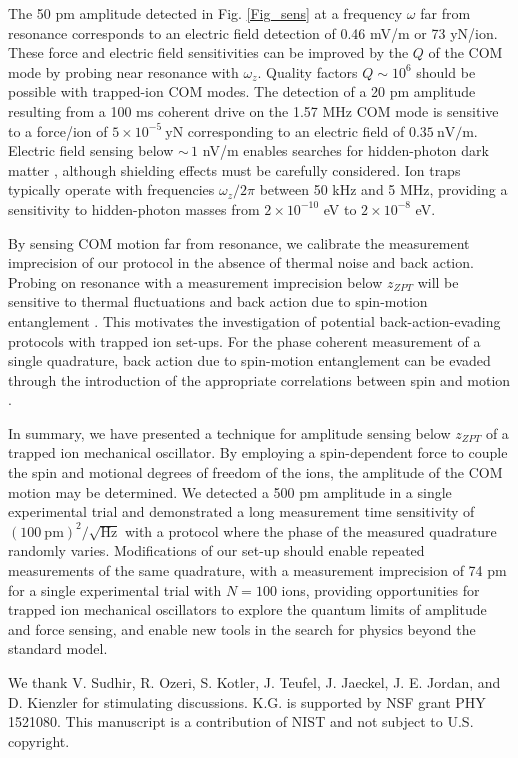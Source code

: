 \documentclass[aps,prl,twocolumn,superscriptaddress,floatfix]{revtex4-1}
\begin{document}
The 50 pm amplitude detected in Fig. \ref{Fig_sens} at a frequency $\omega$ far from resonance corresponds to an electric field detection of 0.46 mV/m or 73 yN/ion. These force and electric field sensitivities can be improved by the $Q$ of the COM mode by probing near resonance with $\omega_z$. Quality factors $Q\sim 10^6$ should be possible with trapped-ion COM modes. The detection of a 20 pm amplitude resulting from a 100 ms coherent drive on the 1.57 MHz COM mode is sensitive to a force/ion of $5\times10^{-5}\:\mathrm{yN}$ corresponding to an electric field of $0.35\:\mathrm{nV/m}$. Electric field sensing below ${\sim} \,1$ nV/m enables searches for hidden-photon dark matter \citep{Arias2012,Chaudhuri2015}, although shielding effects must be carefully considered. Ion traps typically operate with frequencies $\omega_z/2\pi$ between 50 kHz and 5 MHz, providing a sensitivity to hidden-photon masses from $2 \times 10^{-10}$ eV to $2 \times 10^{-8}$ eV. 

By sensing COM motion far from resonance, we calibrate the measurement imprecision of our protocol in the absence of thermal noise and back action. Probing on resonance with a measurement imprecision below $z_{ZPT}$ will be sensitive to thermal fluctuations and back action due to spin-motion entanglement \citep{Sawyer2014}. This motivates the investigation of potential back-action-evading protocols with trapped ion set-ups. For the phase coherent measurement of a single quadrature, back action due to spin-motion entanglement can be evaded through the introduction of the appropriate correlations between spin and motion \citep{Hempel2013}.

In summary, we have presented a technique for amplitude sensing below $z_{ZPT}$ of a trapped ion mechanical oscillator. By employing a spin-dependent force to couple the spin and motional degrees of freedom of the ions, the amplitude of the COM motion may be determined. We detected a 500 pm amplitude in a single experimental trial and demonstrated a long measurement time sensitivity of $\left(100\:\mathrm{pm}\right)^{2}/\sqrt{\mathrm{Hz}}$ with a protocol where the phase of the measured quadrature randomly varies. Modifications of our set-up should enable repeated measurements of the same quadrature, with a measurement imprecision of 74 pm for a single experimental trial with $N = 100$ ions, providing opportunities for trapped ion mechanical oscillators to explore the quantum limits of amplitude and force sensing, and enable new tools in the search for physics beyond the standard model.

\begin{acknowledgments}
We thank V. Sudhir, R. Ozeri, S. Kotler, J. Teufel, J. Jaeckel, J. E. Jordan, and D. Kienzler for stimulating discussions. K.G. is supported by NSF grant PHY 1521080. This manuscript is a contribution of NIST and not subject to U.S. copyright.
\end{acknowledgments}



\end{document}
